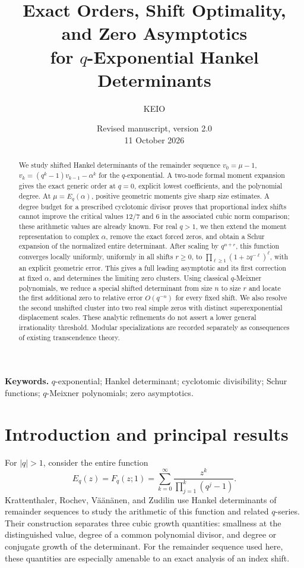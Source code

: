 \documentclass[11pt]{article}
\title{\bfseries Exact Orders, Shift Optimality, and Zero Asymptotics\\[2mm]
for $q$-Exponential Hankel Determinants}
\author{KEIO}
\date{Revised manuscript, version 2.0\\11 October 2026}
\numberwithin{equation}{section}
\theoremstyle{definition}
\theoremstyle{remark}
\begin{document}
\maketitle
\begin{abstract}
We study shifted Hankel determinants of the remainder sequence
$v_0=\mu-1$, $v_k=(q^k-1)v_{k-1}-\alpha^k$ for the $q$-exponential.
A two-node formal moment expansion gives the exact generic order at $q=0$,
explicit lowest coefficients, and the polynomial degree.
At $\mu=E_q(\alpha)$, positive geometric moments give sharp size estimates.
A degree budget for a prescribed cyclotomic divisor proves that proportional
index shifts cannot improve the critical values $12/7$ and $6$ in the
associated cubic norm comparison; these arithmetic values are already known.
For real $q>1$, we then extend the moment representation to complex
$\alpha$, remove the exact forced zeros, and obtain a Schur expansion
of the normalized entire determinant. After scaling by $q^{n+r}$, this
function converges locally uniformly, uniformly in all shifts $r\ge0$, to
$\prod_{\ell\ge1}(1+zq^{-\ell})^\ell$, with an explicit geometric error.
This gives a full leading asymptotic and its first correction at fixed
$\alpha$, and determines the limiting zero clusters.
Using classical $q$-Meixner polynomials, we reduce a special shifted
determinant from size $n$ to size $r$ and locate the first additional zero
to relative error $O(q^{-n})$ for every fixed shift. We also resolve the
second unshifted cluster into two real simple zeros with distinct
superexponential displacement scales.
These analytic refinements do not assert a lower general irrationality
threshold. Modular specializations are recorded separately as consequences
of existing transcendence theory.
\end{abstract}
\noindent\textbf{Keywords.} $q$-exponential; Hankel determinant; cyclotomic divisibility;
Schur functions; $q$-Meixner polynomials; zero asymptotics.

\section{Introduction and principal results}\label{sec:introduction}

For $|q|>1$, consider the entire function
\begin{equation}\label{eq:exponential}
 E_q(z)=F_q(z;1)=\sum_{k=0}^{\infty}
 \frac{z^k}{\prod_{j=1}^{k}(q^j-1)}.
\end{equation}
Krattenthaler, Rochev, V\"a\"an\"anen, and Zudilin
\cite{KRVZ} use Hankel determinants of remainder sequences to study the
arithmetic of this function and related $q$-series. Their construction separates
three cubic growth quantities: smallness at the distinguished value, degree of
a common polynomial divisor, and degree or conjugate growth of the determinant.
For the remainder sequence used here, these quantities are especially amenable
to an exact analysis of an index shift.
\end{document}
